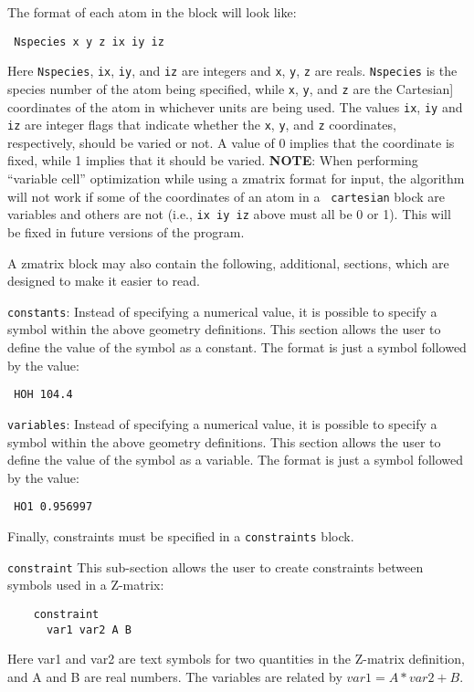 \documentclass[11pt]{article}
\begin{document}
\begin{description}
The format of each atom in the block will look like:

\noindent\texttt{      Nspecies x y z ix iy iz}

Here \texttt{Nspecies}, \texttt{ix}, \texttt{iy}, and \texttt{iz} are
integers and \texttt{x}, \texttt{y}, \texttt{z} are
reals. \texttt{Nspecies} is the species number of the atom being
specified, while \texttt{x}, \texttt{y}, and \texttt{z} are the
Cartesian] coordinates of the atom in whichever units are being
used. The values \texttt{ix}, \texttt{iy} and \texttt{iz} are integer
flags that indicate whether the \texttt{x}, \texttt{y}, and \texttt{z}
coordinates, respectively, should be varied or not. A value of 0
implies that the coordinate is fixed, while 1 implies that it should
be varied.  {\bf NOTE}: When performing ``variable cell''
optimization while using a zmatrix format for input, the algorithm
will not work if some of the coordinates of an atom in a {\tt
cartesian} block are variables and others are not (i.e., 
\texttt{ix iy iz} above must all be 0 or 1). This will be fixed in
future versions of the program.

A zmatrix block may also contain the following, additional, sections, which
are designed to make it easier to read.

\item \texttt{constants}: Instead of specifying a numerical value, it is possible to specify a symbol
within the above geometry definitions. This section allows the user to define the value
of the symbol as a constant. The format is just a symbol followed by the value:

\noindent\texttt{      HOH 104.4}

\item \texttt{variables}: Instead of specifying a numerical value, it is possible to specify a symbol
within the above geometry definitions. This section allows the user to define the value
of the symbol as a variable. The format is just a symbol followed by the value:

\noindent\texttt{      HO1 0.956997}

Finally, constraints must be specified in a \texttt{constraints} block.

\item \texttt{constraint} This sub-section allows the user to create constraints between symbols used
in a Z-matrix:
\begin{verbatim}
    constraint
      var1 var2 A B
\end{verbatim}
Here var1 and var2 are text symbols for two quantities in the Z-matrix definition, and A
and B are real numbers. The variables are related by $var1 = A*var2 + B$.


\end{description}
\end{document}
